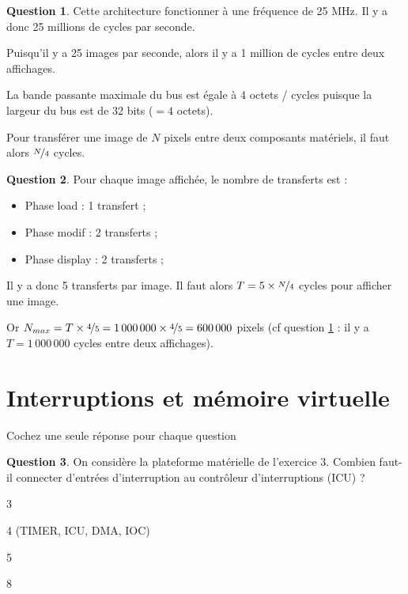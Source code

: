 \documentclass[11pt,english,french]{scrreprt}
\theoremstyle{remark}
\theoremstyle{definition}
\newtheorem{ques}{Question}[section]
\begin{document}
\begin{ques}\label{ques:c2}
	Cette architecture fonctionner à une fréquence de 25 MHz. Il y a donc 25 millions de cycles par seconde.
	
	Puisqu'il y a 25 images par seconde, alors il y a 1 million de cycles entre deux affichages. 
	
	La bande passante maximale du bus est égale à 4 octets / cycles puisque la largeur du bus est de 32 bits ($=4$ octets).
	
	Pour transférer une image de $N$ pixels entre deux composants matériels, il faut alors $\nicefrac{N}{4}$ cycles.
\end{ques}

\begin{ques}
	Pour chaque image affichée, le nombre de transferts est :\begin{itemize}
		\item Phase load : 1 transfert ;
		\item Phase modif : 2 transferts ;
		\item Phase display : 2 transferts ;
	\end{itemize}
	
	Il y a donc 5 transferts par image. Il faut alors $T = 5\times \nicefrac{N}{4}$ cycles pour afficher une image.
	
	Or $N_{max} = T\times \nicefrac{4}{5} = 1\,000\,000\times\nicefrac{4}{5} = 600\,000$ pixels (cf question \ref{ques:c2} : il y a $T=1\,000\,000$ cycles entre deux affichages).
\end{ques}

\clearpage

\section{Interruptions et mémoire virtuelle} %

Cochez une seule réponse pour chaque question

\begin{ques}
	On considère la plateforme matérielle de l'exercice 3. Combien faut-il connecter d'entrées d'interruption au contrôleur d'interruptions (ICU) ?
\begin{description}
	\setlength{\itemsep}{2pt}
	\setlength{\parskip}{-1pt}
	\setlength{\parsep}{-1pt}
	\item[\Square] 3
	\item[\CheckedBox] 4 (TIMER, ICU, DMA, IOC)
	\item[\Square] 5
	\item[\Square] 8
\end{description}
\end{ques}
\end{document}

